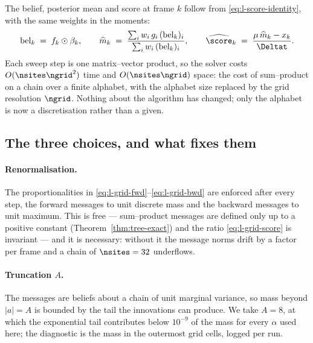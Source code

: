 The belief, posterior mean and score at frame $k$ follow from
\eqref{eq:l-score-identity}, with the same weights in the moments:
\begin{equation}
  \mathrm{bel}_k \;=\; f_k \odot \beta_k,
  \qquad
  \widehat m_k
    \;=\; \frac{\sum_i w_i\, g_i\, (\mathrm{bel}_k)_i}{\sum_i w_i\, (\mathrm{bel}_k)_i},
  \qquad
  \widehat \score_k \;=\; \frac{\mu\, \widehat m_k - x_k}{\Deltat}.
  \label{eq:l-grid-score}
\end{equation}
Each sweep step is one matrix--vector product, so the solver costs
$O(\nsites \ngrid^2)$ time and $O(\nsites \ngrid)$ space: the cost of
sum--product on a chain over a finite alphabet, with the alphabet size
replaced by the grid resolution $\ngrid$. Nothing about the algorithm has
changed; only the alphabet is now a discretisation rather than a given.

\subsection{The three choices, and what fixes them}

\paragraph{Renormalisation.} The proportionalities in
\eqref{eq:l-grid-fwd}--\eqref{eq:l-grid-bwd} are enforced after every step, the
forward messages to unit discrete mass and the backward messages to unit
maximum. This is free --- sum--product messages are defined only up to a
positive constant (Theorem~\ref{thm:tree-exact}) and the ratio
\eqref{eq:l-grid-score} is invariant --- and it is necessary: without it the
message norms drift by a factor per frame and a chain of $\nsites = 32$
underflows.

\paragraph{Truncation $A$.} The messages are beliefs about a chain of unit
marginal variance, so mass beyond $|a| = A$ is bounded by the tail the
innovations can produce. We take $A = 8$, at which the exponential tail
contributes below $10^{-9}$ of the mass for every $\alpha$ used here; the
diagnostic is the mass in the outermost grid cells, logged per run.

